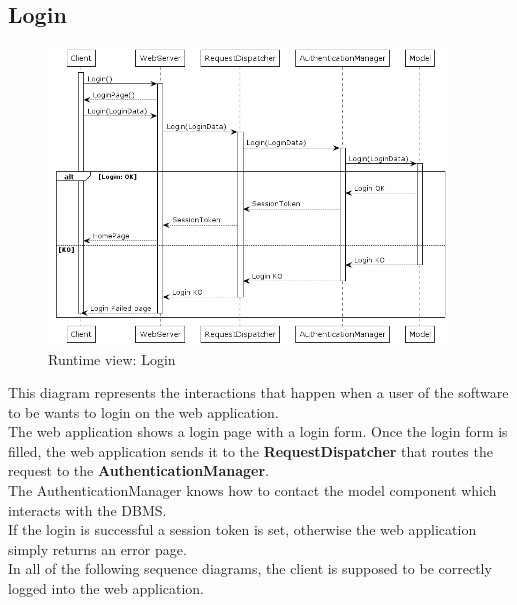 \documentclass[10pt]{report}
\begin{document}
\subsection{Login}
\begin{figure}[H]
    \centering
    \includegraphics[width=400px]{SequenceDiagram/login.png}
    \caption{Runtime view: Login}
\end{figure}
This diagram represents the interactions that happen when a user of the software to be wants to login on the web application. \\The web application shows a login page with a login form. Once the login form is filled, the web application sends it to the \textbf{RequestDispatcher} that routes the request to the \textbf{AuthenticationManager}.\\ The AuthenticationManager knows how to contact the model component which interacts with the DBMS. \\If the login is successful a session token is set, otherwise the web application simply returns an error page. \\In all of the following sequence diagrams, the client is supposed to be correctly logged into the web application.
\end{document}
